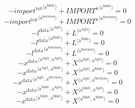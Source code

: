 \begin{equation}
-{{i\!m\!p\!o\!r\!t}^{\mathrm{tot}}}^{\langle \mathrm{\mathrm{a}^{\mathrm{Mnfc}}}\rangle} + {{I\!M\!P\!O\!R\!T}^{\mathrm{a}}}^{\langle \mathrm{a}^{\mathrm{Mnfc}}\rangle} = 0
\end{equation}
\begin{equation}
-{{i\!m\!p\!o\!r\!t}^{\mathrm{tot}}}^{\langle \mathrm{\mathrm{a}^{\mathrm{Services}}}\rangle} + {{I\!M\!P\!O\!R\!T}^{\mathrm{a}}}^{\langle \mathrm{a}^{\mathrm{Services}}\rangle} = 0
\end{equation}
\begin{equation}
-{l^{\mathrm{data}}}^{\langle \mathrm{\mathrm{a}^{\mathrm{Agri}}}\rangle} + {L}^{\langle \mathrm{a}^{\mathrm{Agri}}\rangle} = 0
\end{equation}
\begin{equation}
-{l^{\mathrm{data}}}^{\langle \mathrm{\mathrm{a}^{\mathrm{Mnfc}}}\rangle} + {L}^{\langle \mathrm{a}^{\mathrm{Mnfc}}\rangle} = 0
\end{equation}
\begin{equation}
-{l^{\mathrm{data}}}^{\langle \mathrm{\mathrm{a}^{\mathrm{Services}}}\rangle} + {L}^{\langle \mathrm{a}^{\mathrm{Services}}\rangle} = 0
\end{equation}
\begin{equation}
-{x^{\mathrm{data}}}^{\langle \mathrm{\mathrm{a}^{\mathrm{Agri}}},\mathrm{\mathrm{a}^{\mathrm{Agri}}}\rangle} + {X}^{\langle \mathrm{a}^{\mathrm{Agri}},\mathrm{a}^{\mathrm{Agri}}\rangle} = 0
\end{equation}
\begin{equation}
-{x^{\mathrm{data}}}^{\langle \mathrm{\mathrm{a}^{\mathrm{Agri}}},\mathrm{\mathrm{a}^{\mathrm{Mnfc}}}\rangle} + {X}^{\langle \mathrm{a}^{\mathrm{Agri}},\mathrm{a}^{\mathrm{Mnfc}}\rangle} = 0
\end{equation}
\begin{equation}
-{x^{\mathrm{data}}}^{\langle \mathrm{\mathrm{a}^{\mathrm{Agri}}},\mathrm{\mathrm{a}^{\mathrm{Services}}}\rangle} + {X}^{\langle \mathrm{a}^{\mathrm{Agri}},\mathrm{a}^{\mathrm{Services}}\rangle} = 0
\end{equation}
\begin{equation}
-{x^{\mathrm{data}}}^{\langle \mathrm{\mathrm{a}^{\mathrm{Mnfc}}},\mathrm{\mathrm{a}^{\mathrm{Agri}}}\rangle} + {X}^{\langle \mathrm{a}^{\mathrm{Mnfc}},\mathrm{a}^{\mathrm{Agri}}\rangle} = 0
\end{equation}
\begin{equation}
-{x^{\mathrm{data}}}^{\langle \mathrm{\mathrm{a}^{\mathrm{Mnfc}}},\mathrm{\mathrm{a}^{\mathrm{Mnfc}}}\rangle} + {X}^{\langle \mathrm{a}^{\mathrm{Mnfc}},\mathrm{a}^{\mathrm{Mnfc}}\rangle} = 0
\end{equation}
